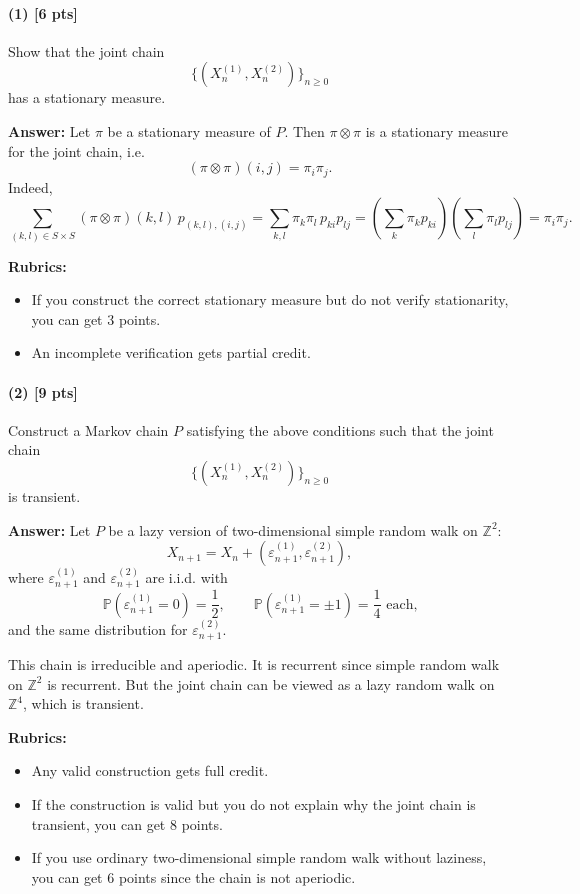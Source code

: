 \documentclass[11pt]{article}
\theoremstyle{definition}
\begin{document}
\paragraph{(1) \hfill [6 pts]}
Show that the joint chain
\[
\{(X_n^{(1)},X_n^{(2)})\}_{n\ge 0}
\]
has a stationary measure.

\textbf{Answer:}
Let \(\pi\) be a stationary measure of \(P\). Then \(\pi\otimes \pi\) is a stationary measure for the joint chain, i.e.
\[
(\pi\otimes \pi)(i,j)=\pi_i\pi_j.
\]
Indeed,
\[
\sum_{(k,l)\in S\times S}(\pi\otimes \pi)(k,l)\,p_{(k,l),(i,j)}
=
\sum_{k,l}\pi_k\pi_l\,p_{ki}p_{lj}
=
\left(\sum_k \pi_k p_{ki}\right)\left(\sum_l \pi_l p_{lj}\right)
=
\pi_i\pi_j.
\]

\textbf{Rubrics:}
\begin{itemize}[leftmargin=2em]
    \item If you construct the correct stationary measure but do not verify stationarity, you can get \(3\) points.
    \item An incomplete verification gets partial credit.
\end{itemize}

\paragraph{(2) \hfill [9 pts]}
Construct a Markov chain \(P\) satisfying the above conditions such that the joint chain
\[
\{(X_n^{(1)},X_n^{(2)})\}_{n\ge 0}
\]
is transient.

\textbf{Answer:}
Let \(P\) be a lazy version of two-dimensional simple random walk on \(\mathbb Z^2\):
\[
X_{n+1}=X_n+(\varepsilon_{n+1}^{(1)},\varepsilon_{n+1}^{(2)}),
\]
where \(\varepsilon_{n+1}^{(1)}\) and \(\varepsilon_{n+1}^{(2)}\) are i.i.d. with
\[
\mathbb P(\varepsilon_{n+1}^{(1)}=0)=\frac12,
\qquad
\mathbb P(\varepsilon_{n+1}^{(1)}=\pm 1)=\frac14 \text{ each,}
\]
and the same distribution for \(\varepsilon_{n+1}^{(2)}\).

This chain is irreducible and aperiodic. It is recurrent since simple random walk on \(\mathbb Z^2\) is recurrent. But the joint chain can be viewed as a lazy random walk on \(\mathbb Z^4\), which is transient.

\textbf{Rubrics:}
\begin{itemize}[leftmargin=2em]
    \item Any valid construction gets full credit.
    \item If the construction is valid but you do not explain why the joint chain is transient, you can get \(8\) points.
    \item If you use ordinary two-dimensional simple random walk without laziness, you can get \(6\) points since the chain is not aperiodic.
\end{itemize}
\end{document}
